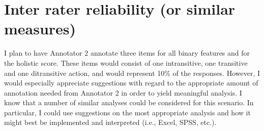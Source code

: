 \documentclass[11pt]{article}
\begin{document}
\section{Inter rater reliability (or similar measures)}

I plan to have Annotator 2 annotate three items for all binary features and for the holistic score. These items would consist of one intransitive, one transitive and one ditransitive action, and would represent 10\% of the responses. However, I would especially appreciate suggestions with regard to the appropriate amount of annotation needed from Annotator 2 in order to yield meaningful analysis. I know that a number of similar analyses could be considered for this scenario. In particular, I could use suggestions on the most appropriate analysis and how it might best be implemented and interpreted (i.e., Excel, SPSS, etc.).
\end{document}
